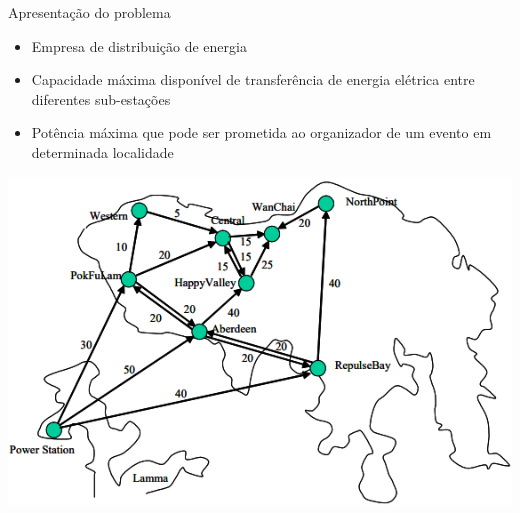 \documentclass{beamer}
\newenvironment{outeritemize}{\begin{itemize}}{\end{itemize}\vspace{12pt}}
\begin{document}
\begin{frame}{Apresentação do problema}

\begin{outeritemize}
    \item Empresa de distribuição de energia
    \item Capacidade máxima disponível de transferência de energia elétrica entre diferentes sub-estações
    \item Potência máxima que pode ser prometida ao organizador de um evento em determinada localidade
\end{outeritemize}

\begin{center}
\includegraphics[scale=0.45]{assets/FluxoMaximo/Screenshot_1.png}    
\end{center}

\end{frame}
\end{document}
